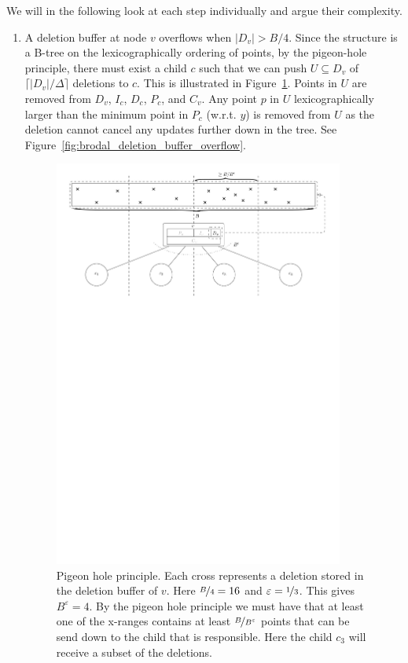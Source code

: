\documentclass[twoside,11pt,openright]{report}
\def \epsilon {\varepsilon}
\begin{document}
We will in the following look at each step individually and argue their complexity.

\begin{enumerate}[label=(\roman*)]
	\item\label{update:del} A deletion buffer at node $v$ overflows when $\vert D_v \vert > B/4$. Since the structure is a B-tree on the lexicographically ordering of points, by the pigeon-hole principle, there must exist a child $c$ such that we can push $U \subseteq D_v$ of $\lceil \vert D_v \vert / \Delta \rceil$ deletions to $c$. This is illustrated in Figure~\ref{fig:pigeon_hole}. Points in $U$ are removed from $D_v$, $I_c$, $D_c$, $P_c$, and $C_v$. Any point $p$ in $U$ lexicographically larger than the minimum point in $P_c$ (w.r.t. $y$) is removed from $U$ as the deletion cannot cancel any updates further down in the tree. See Figure~\ref{fig:brodal_deletion_buffer_overflow}.
	
	\begin{figure}[htp!]
		\centering
		\includegraphics[width=0.9\textwidth]{../figures/pigeon_hole2}
		\caption{Pigeon hole principle. Each cross represents a deletion stored in the deletion buffer of $v$. Here $\nicefrac{B}{4} = 16$ and $\epsilon = \nicefrac{1}{3}$. This gives $B^{\epsilon} = 4$. By the pigeon hole principle we must have that at least one of the x-ranges contains at least $\nicefrac{B}{B^{\epsilon}}$ points that can be send down to the child that is responsible. Here the child $c_3$ will receive a subset of the deletions.}
		\label{fig:pigeon_hole}
	\end{figure}
	

\end{enumerate}
\end{document}
